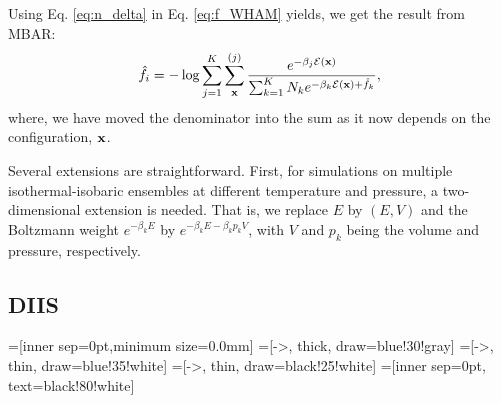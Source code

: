 \documentclass[aip,jcp,preprint,superscriptaddress]{revtex4-1}
\begin{document}
Using Eq. \eqref{eq:n_delta} in Eq. \eqref{eq:f_WHAM} yields,
we get the result from MBAR\cite{shirts2008}:
%
\begin{equation}
\hat f_i
=
-\log
\sum_{j = 1}^K
\sum_{\mathbf{x}}^{(j)}
\frac{
  e^{-\beta_j \mathcal{E}(\mathbf{x})}
}
{
  \sum_{k = 1}^K N_k e^{-\beta_k \mathcal{E}(\mathbf{x}) + \hat f_k}
},
\label{eq:f_MBAR}
\end{equation}
%
where,
we have moved the denominator into the sum
as it now depends on the configuration, $\mathbf{x}$.



Several extensions are straightforward.
%
First,
for simulations on multiple isothermal-isobaric ensembles
at different temperature and pressure,
a two-dimensional extension is needed.
%
That is,
we replace $E$ by $(E, V)$
and the Boltzmann weight
$e^{-\beta_k E}$
by
$e^{-\beta_k E - \beta_k p_k V}$,
with
$V$ and $p_k$
being the volume and pressure,
respectively.





\subsection{DIIS}





=[inner sep=0pt,minimum size=0.0mm]
=[->, thick, draw=blue!30!gray]
=[->, thin, draw=blue!35!white]
=[->, thin, draw=black!25!white]
=[inner sep=0pt, text=black!80!white]
\end{document}
